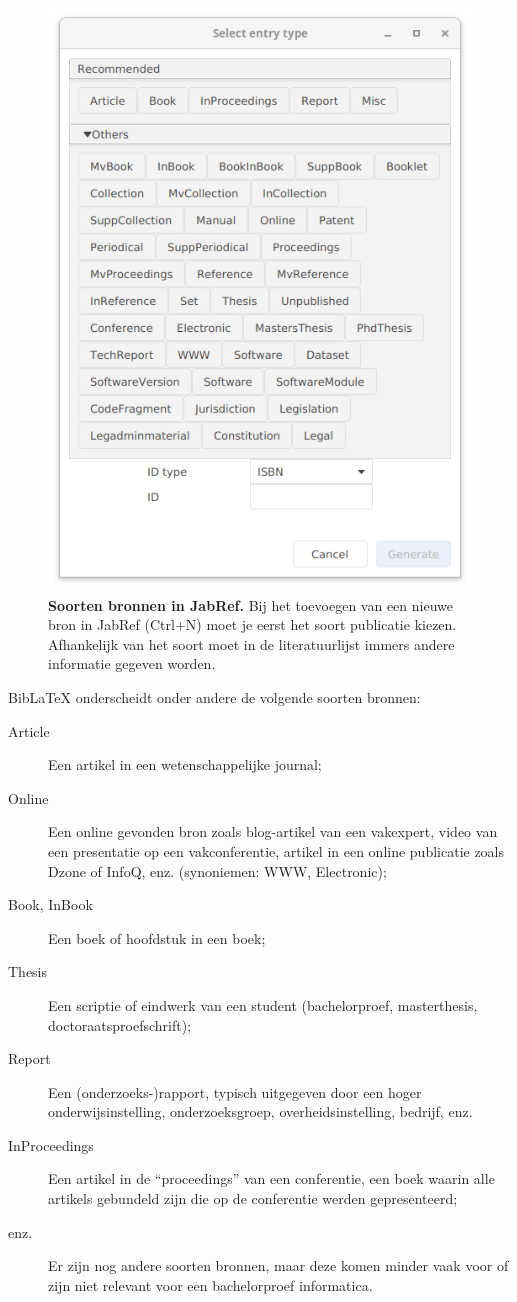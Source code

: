 \begin{figure}
  \centering
  \includegraphics[width=0.6\linewidth]{img/jabref-entrytypes}
  \caption[Soorten bronnen in JabRef]{\label{fig:jabref-entrytypes}\textbf{Soorten bronnen in JabRef.} Bij het toevoegen van een nieuwe bron in JabRef (Ctrl+N) moet je eerst het soort publicatie kiezen. Afhankelijk van het soort moet in de literatuurlijst immers andere informatie gegeven worden.}
\end{figure}

Bib{\LaTeX} onderscheidt onder andere de volgende soorten bronnen:

\begin{description}
  \item[Article] Een artikel in een wetenschappelijke journal;
  \item[Online] Een online gevonden bron zoals blog-artikel van een vakexpert, video van een presentatie op een vakconferentie, artikel in een online publicatie zoals Dzone of InfoQ, enz. (synoniemen: WWW, Electronic);
  \item[Book, InBook] Een boek of hoofdstuk in een boek;
  \item[Thesis] Een scriptie of eindwerk van een student (bachelorproef, masterthesis, doctoraatsproefschrift);
  \item[Report] Een (onderzoeks-)rapport, typisch uitgegeven door een hoger onderwijsinstelling, onderzoeksgroep, overheidsinstelling, bedrijf, enz.
  \item[InProceedings] Een artikel in de ``proceedings'' van een conferentie, een boek waar\-in alle artikels gebundeld zijn die op de conferentie werden gepresenteerd;
  \item[enz.] Er zijn nog andere soorten bronnen, maar deze komen minder vaak voor of zijn niet relevant voor een bachelorproef informatica.
\end{description}

